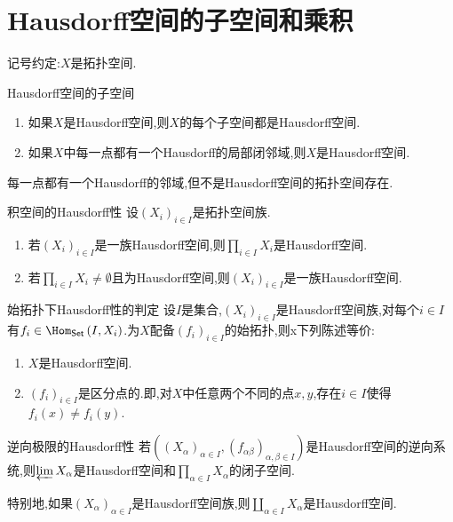 \section{Hausdorff空间的子空间和乘积}

记号约定:$X$是拓扑空间.

\begin{proposition}{Hausdorff空间的子空间}{}
	\begin{enumerate}
		\item 如果$X$是Hausdorff空间,则$X$的每个子空间都是Hausdorff空间.
		\item 如果$X$中每一点都有一个Hausdorff的局部闭邻域,则$X$是Hausdorff空间.
	\end{enumerate}
\end{proposition}

\begin{remark}{}{}
	每一点都有一个Hausdorff的邻域,但不是Hausdorff空间的拓扑空间存在.
\end{remark}

\begin{proposition}{积空间的Hausdorff性}{}
	设$\left(X_{i}\right)_{i\in I}$是拓扑空间族.
	\begin{enumerate}
		\item 若$\left(X_{i}\right)_{i\in I}$是一族Hausdorff空间,则$\prod\limits_{i\in I}X_{i}$是Hausdorff空间.
		\item 若$\prod\limits_{i\in I}X_{i}\neq\emptyset$且为Hausdorff空间,则$\left(X_{i}\right)_{i\in I}$是一族Hausdorff空间.
	\end{enumerate}
\end{proposition}

\begin{corollary}{始拓扑下Hausdorff性的判定}{}
	设$I$是集合,$\left(X_{i}\right)_{i\in I}$是Hausdorff空间族,对每个$i\in I$有$f_{i}\in\Hom_{\mathsf{Set}}\left(I,X_{i}\right)$.为$X$配备$\left(f_{i}\right)_{i\in I}$的始拓扑,则x下列陈述等价:
	\begin{enumerate}
		\item $X$是Hausdorff空间.
		\item $\left(f_{i}\right)_{i\in I}$是区分点的.即,对$X$中任意两个不同的点$x,y$,存在$i\in I$使得$f_{i}\left(x\right)\neq f_{i}\left(y\right)$.
	\end{enumerate}
\end{corollary}

\begin{corollary}{逆向极限的Hausdorff性}{}
	若$\left(\left(X_{\alpha}\right)_{\alpha\in I},\left(f_{\alpha\beta}\right)_{\alpha,\beta\in I}\right)$是Hausdorff空间的逆向系统,则$\varprojlim X_{\alpha}$是Hausdorff空间和$\prod\limits_{\alpha\in I}X_{\alpha}$的闭子空间.
\end{corollary}

\begin{remark}{}{}
	特别地,如果$\left(X_{\alpha}\right)_{\alpha\in I}$是Hausdorff空间族,则$\coprod\limits_{\alpha\in I}X_{\alpha}$是Hausdorff空间.
\end{remark}




